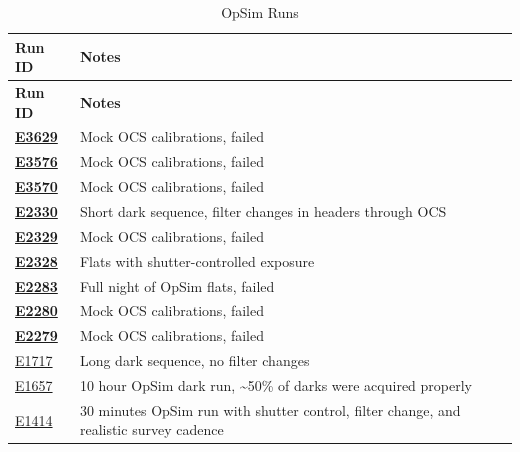 \begin{longtable}{|p{5.0cm}|p{8.5cm}|}
\caption{OpSim Runs}\label{table:runs_opSim} \\
\hline
\textbf{Run ID} & \textbf{Notes} \\ \hline
\endfirsthead
\hline
\textbf{Run ID} & \textbf{Notes} \\ \hline
\endhead
\hline
\endfoot
\hline
\endlastfoot

\textbf{\href{https://s3df.slac.stanford.edu/data/rubin/lsstcam/E3629/w_2024_35/}{E3629}} & Mock OCS calibrations, failed \\ \hline
\textbf{\href{https://s3df.slac.stanford.edu/data/rubin/lsstcam/E3576/w_2024_35/}{E3576}} & Mock OCS calibrations, failed \\ \hline
\textbf{\href{https://s3df.slac.stanford.edu/data/rubin/lsstcam/E3570/w_2024_35/}{E3570}} & Mock OCS calibrations, failed \\ \hline
\textbf{\href{https://s3df.slac.stanford.edu/data/rubin/lsstcam/E2330/w_2024_35/}{E2330}} & Short dark sequence, filter changes in headers through OCS \\ \hline
\textbf{\href{https://s3df.slac.stanford.edu/data/rubin/lsstcam/E2329/w_2024_35/}{E2329}} & Mock OCS calibrations, failed \\ \hline
\textbf{\href{https://s3df.slac.stanford.edu/data/rubin/lsstcam/E2328/w_2024_35/}{E2328}} & Flats with shutter-controlled exposure \\ \hline
\textbf{\href{https://s3df.slac.stanford.edu/data/rubin/lsstcam/E2283/w_2024_35/}{E2283}} & Full night of OpSim flats, failed \\ \hline
\textbf{\href{https://s3df.slac.stanford.edu/data/rubin/lsstcam/E2280/w_2024_35/}{E2280}} & Mock OCS calibrations, failed \\ \hline
\textbf{\href{https://s3df.slac.stanford.edu/data/rubin/lsstcam/E2279/w_2024_35/}{E2279}} & Mock OCS calibrations, failed \\ \hline
\href{https://s3df.slac.stanford.edu/data/rubin/lsstcam/E1717/w_2024_35/}{E1717} & Long dark sequence, no filter changes \\ \hline
\href{https://s3df.slac.stanford.edu/data/rubin/lsstcam/E1657/w_2024_35/}{E1657} & 10 hour OpSim dark run, \textasciitilde50\% of darks were acquired properly \\ \hline
\href{https://s3df.slac.stanford.edu/data/rubin/lsstcam/E1414/w_2024_35/}{E1414} & 30 minutes OpSim run with shutter control, filter change, and realistic survey cadence \\ \hline

\end{longtable}
